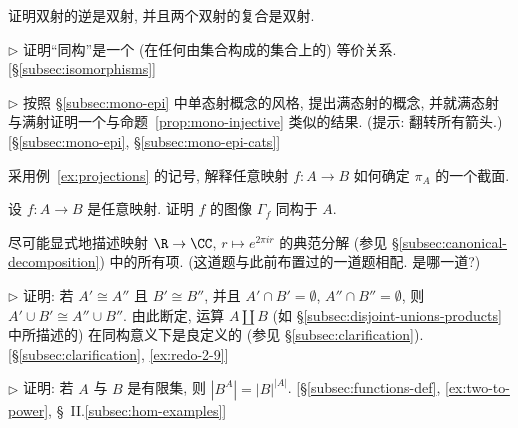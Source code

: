 \begin{prob}
\label{ex:inverse-bijection}
证明双射的逆是双射, 并且两个双射的复合是双射.
\end{prob}

\begin{prob}
\label{ex:iso-equiv-rel}
$\triangleright$ 证明``同构''是一个 (在任何由集合构成的集合上的) 等价关系. [\S\ref{subsec:isomorphisms}]
\end{prob}

\begin{prob}
\label{ex:epimorphism}
$\triangleright$ 按照 \S\ref{subsec:mono-epi} 中单态射概念的风格, 提出满态射的概念, 并就满态射与满射证明一个与命题~\ref{prop:mono-injective} 类似的结果. (提示: 翻转所有箭头.) [\S\ref{subsec:mono-epi}, \S\ref{subsec:mono-epi-cats}]
\end{prob}

\begin{prob}
\label{ex:section-of-projection}
采用例~\ref{ex:projections} 的记号, 解释任意映射 $f : A \to B$ 如何确定 $\pi_A$ 的一个截面.
\end{prob}

\begin{prob}
\label{ex:graph-iso}
设 $f : A \to B$ 是任意映射. 证明 $f$ 的图像 $\Gamma_f$ 同构于 $A$.
\end{prob}

\begin{prob}
\label{ex:canonical-decomp-exp}
尽可能显式地描述映射 $\R \to \CC$, $r \mapsto e^{2\pi i r}$ 的典范分解 (参见 \S\ref{subsec:canonical-decomposition}) 中的所有项. (这道题与此前布置过的一道题相配. 是哪一道?)
\end{prob}

\begin{prob}
\label{ex:disjoint-union-welldef}
$\triangleright$ 证明: 若 $A' \cong A''$ 且 $B' \cong B''$, 并且 $A' \cap B' = \emptyset$, $A'' \cap B'' = \emptyset$, 则 $A' \cup B' \cong A'' \cup B''$. 由此断定, 运算 $A \amalg B$ (如 \S\ref{subsec:disjoint-unions-products} 中所描述的) 在同构意义下是良定义的 (参见 \S\ref{subsec:clarification}). [\S\ref{subsec:clarification}, \ref{ex:redo-2-9}]
\end{prob}

\begin{prob}
\label{ex:card-ba}
$\triangleright$ 证明: 若 $A$ 与 $B$ 是有限集, 则 $|B^A| = |B|^{|A|}$. [\S\ref{subsec:functions-def}, \ref{ex:two-to-power}, \S~II.\ref{subsec:hom-examples}]
\end{prob}

